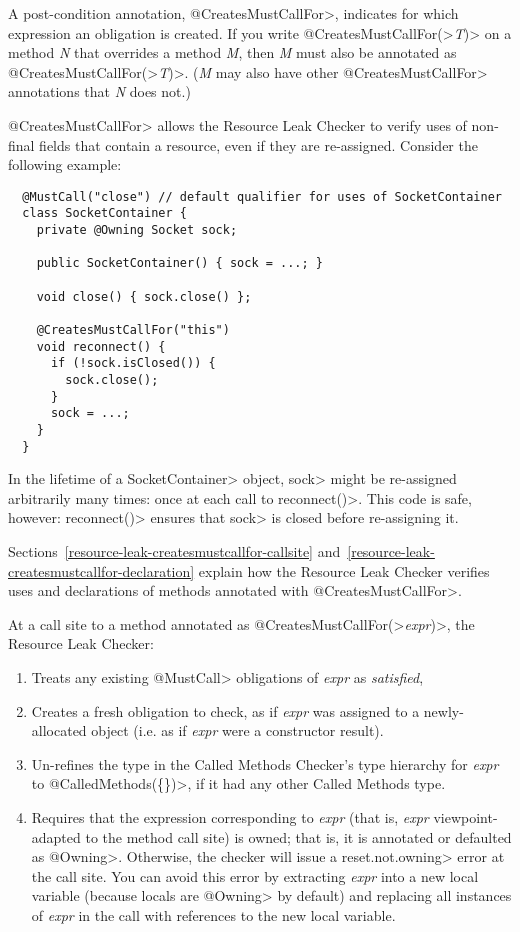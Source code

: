 A post-condition annotation,
\<@CreatesMustCallFor>,
indicates for which expression an obligation is created.
If you write \<@CreatesMustCallFor(>\emph{T}\<)> on a method \emph{N} that
overrides a method \emph{M}, then \emph{M} must also be annotated as
\<@CreatesMustCallFor(>\emph{T}\<)>.  (\emph{M} may also have other
\<@CreatesMustCallFor> annotations that \emph{N} does not.)

\<@CreatesMustCallFor> allows the Resource Leak Checker to verify uses of non-final fields
that contain a resource, even if they are re-assigned. Consider
the following example:

\begin{verbatim}
  @MustCall("close") // default qualifier for uses of SocketContainer
  class SocketContainer {
    private @Owning Socket sock;

    public SocketContainer() { sock = ...; }

    void close() { sock.close() };

    @CreatesMustCallFor("this")
    void reconnect() {
      if (!sock.isClosed()) {
        sock.close();
      }
      sock = ...;
    }
  }
\end{verbatim}

In the lifetime of a \<SocketContainer> object, \<sock>
might be re-assigned arbitrarily many times: once at each
call to \<reconnect()>. This code is safe, however: \<reconnect()>
ensures that \<sock> is closed before re-assigning it.

Sections~\ref{resource-leak-createsmustcallfor-callsite}
and~\ref{resource-leak-createsmustcallfor-declaration}
explain how the Resource Leak Checker verifies uses and declarations of
methods annotated with \<@CreatesMustCallFor>.



At a call site to a method annotated as
\<@CreatesMustCallFor(>\emph{expr}\<)>, the Resource Leak Checker:
\begin{enumerate}
\item
  Treats any existing \<@MustCall> obligations of \emph{expr} as \emph{satisfied},
\item
  Creates a fresh obligation to check, as if \emph{expr} was assigned to a newly-allocated
  object (i.e. as if \emph{expr} were a constructor result).
\item
  Un-refines the type in the Called Methods Checker's type hierarchy for \emph{expr} to
  \<@CalledMethods(\{\})>, if it had any other Called Methods type.
\item
  Requires that the expression corresponding to \emph{expr} (that is, \emph{expr}
  viewpoint-adapted to the method call site) is owned; that is, it is
  annotated or defaulted as \<@Owning>.  Otherwise, the checker
  will issue a \<reset.not.owning> error at the call site. You can avoid this
  error by extracting \emph{expr} into a new local variable (because
  locals are \<@Owning> by default) and replacing all instances of \emph{expr}
  in the call with references to the new local variable.
\end{enumerate}

